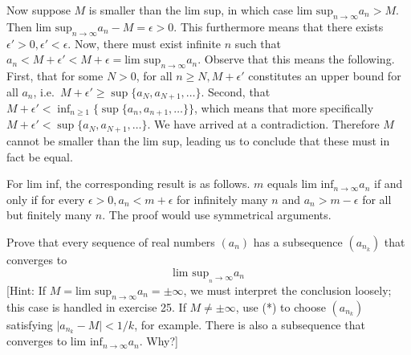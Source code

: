 \begin{solution}
    Now suppose $M$ is smaller than the lim sup, in which case $\text{lim sup}_{n\rightarrow \infty} a_n > M$. Then $\text{lim sup}_{n\rightarrow \infty} a_n - M = \epsilon > 0$. This furthermore means that there exists $\epsilon' > 0, \epsilon' < \epsilon$. Now, there must exist infinite $n$ such that $a_n < M + \epsilon' < M + \epsilon = \text{lim sup}_{n \rightarrow \infty} a_n$. Observe that this means the following. First, that for some $N > 0$, for all $n \geq N, M + \epsilon'$ constitutes an upper bound for all $a_n$, i.e.\ $M + \epsilon' \geq \sup\{a_N, a_{N+1}, \ldots\}$. Second, that $M + \epsilon' < \inf_{n \geq 1}\{\sup\{a_n, a_{n+1}, \ldots\}\}$, which means that more specifically $M + \epsilon' < \sup\{a_N, a_{N+1}, \ldots\}$. We have arrived at a contradiction. Therefore $M$ cannot be smaller than the lim sup, leading us to conclude that these must in fact be equal.

    For lim inf, the corresponding result is as follows. $m$ equals $\text{lim inf}_{n \rightarrow \infty} a_n$ if and only if for every $\epsilon > 0, a_n < m + \epsilon$ for infinitely many $n$ and $a_n > m - \epsilon$ for all but finitely many $n$. The proof would use symmetrical arguments.
\end{solution}

\newpage

\begin{exercise}{27}
    Prove that every sequence of real numbers $(a_n)$ has a subsequence $(a_{n_k})$ that converges to $$\text{lim sup}_{_n \rightarrow \infty} a_n$$
    [Hint: If $M = \text{lim sup}_{n \rightarrow \infty} a_n = \pm \infty$, we must interpret the conclusion loosely; this case is handled in exercise 25. If $M \neq \pm \infty$, use (*) to choose $(a_{n_k})$ satisfying $\lvert a_{n_k} - M \rvert < 1/k$, for example. There is also a subsequence that converges to $\text{lim inf}_{n \rightarrow \infty} a_n$. Why?]
\end{exercise}

